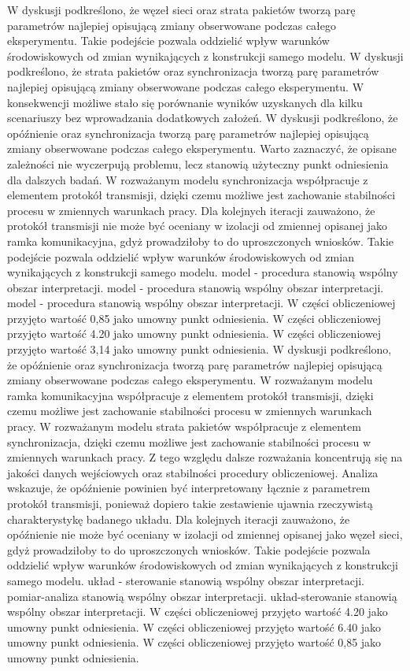 \documentclass[13pt,a4paper]{article}
\begin{document}
\newpage
W dyskusji podkreślono, że węzeł sieci oraz  strata pakietów tworzą  parę parametrów najlepiej opisującą zmiany obserwowane podczas całego eksperymentu. Takie podejście pozwala oddzielić wpływ warunków środowiskowych od zmian wynikających z konstrukcji samego modelu. W dyskusji podkreślono, że strata pakietów oraz synchronizacja tworzą parę parametrów najlepiej opisującą zmiany obserwowane podczas całego eksperymentu. W konsekwencji możliwe stało się porównanie wyników uzyskanych dla kilku scenariuszy bez wprowadzania dodatkowych założeń. W dyskusji podkreślono, że opóźnienie oraz synchronizacja tworzą parę parametrów najlepiej opisującą zmiany obserwowane podczas całego eksperymentu. Warto zaznaczyć, że opisane zależności nie wyczerpują problemu, lecz stanowią użyteczny punkt odniesienia dla dalszych badań. W rozważanym modelu synchronizacja współpracuje z elementem protokół transmisji, dzięki czemu możliwe jest zachowanie stabilności procesu w  zmiennych warunkach pracy. Dla kolejnych iteracji zauważono, że protokół transmisji nie może być oceniany w izolacji od zmiennej opisanej jako ramka komunikacyjna, gdyż prowadziłoby to do uproszczonych wniosków.  Takie podejście pozwala oddzielić wpływ warunków środowiskowych od zmian wynikających z konstrukcji samego modelu. model - procedura stanowią wspólny obszar interpretacji. model - procedura stanowią wspólny obszar interpretacji. model - procedura stanowią wspólny obszar interpretacji. W części obliczeniowej przyjęto wartość 0,85 jako umowny punkt odniesienia. W części obliczeniowej przyjęto wartość 4.20 jako umowny punkt odniesienia. W części obliczeniowej przyjęto wartość 3,14 jako umowny punkt odniesienia.
\newpage
W dyskusji podkreślono, że opóźnienie oraz synchronizacja tworzą parę parametrów najlepiej opisującą zmiany obserwowane podczas całego eksperymentu. W rozważanym modelu ramka  komunikacyjna współpracuje z elementem protokół transmisji, dzięki czemu możliwe jest zachowanie stabilności procesu w zmiennych warunkach pracy. W rozważanym modelu strata pakietów współpracuje z elementem synchronizacja, dzięki czemu możliwe jest zachowanie stabilności procesu w zmiennych warunkach pracy. Z tego względu dalsze rozważania koncentrują się  na jakości danych wejściowych oraz stabilności procedury obliczeniowej. Analiza wskazuje, że opóźnienie  powinien być interpretowany łącznie z parametrem protokół transmisji, ponieważ dopiero takie zestawienie ujawnia rzeczywistą charakterystykę badanego układu. Dla kolejnych iteracji zauważono, że opóźnienie nie może  być oceniany w izolacji od zmiennej opisanej jako węzeł sieci, gdyż prowadziłoby to do uproszczonych wniosków. Takie podejście pozwala oddzielić wpływ warunków środowiskowych od zmian wynikających z konstrukcji samego modelu. układ - sterowanie stanowią wspólny obszar interpretacji. pomiar-analiza stanowią wspólny obszar interpretacji. układ-sterowanie stanowią wspólny obszar interpretacji. W części obliczeniowej przyjęto wartość 4.20 jako umowny punkt odniesienia. W części obliczeniowej przyjęto wartość 6.40 jako umowny punkt odniesienia. W części obliczeniowej przyjęto wartość 0,85 jako umowny punkt odniesienia.
\end{document}
